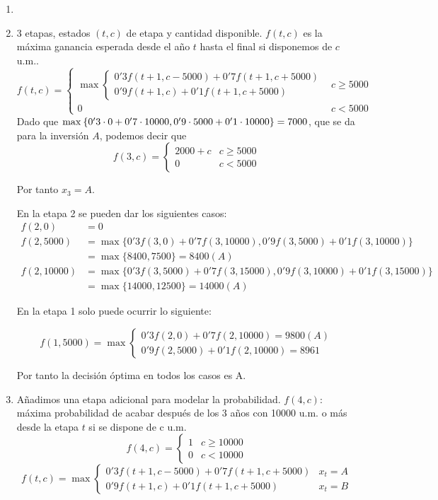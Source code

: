 \documentclass[twoside]{article}
\begin{document}
\begin{solucion}
\begin{enumerate}
\item[]
\item 3 etapas, estados $(t,c)$ de etapa y cantidad disponible. $f(t,c)$ es la máxima ganancia esperada desde el año $t$ hasta el final si disponemos de $c$ u.m..
$$f(t,c)=\begin{cases}
\max\begin{cases}
0'3f(t+1,c-5000)+0'7f(t+1,c+5000)\\
0'9f(t+1,c)+0'1f(t+1,c+5000)
\end{cases}& c\geq 5000\\
0 & c<5000
\end{cases}
$$
Dado que $\max_{}{\left\{0'3\cdot 0+0'7\cdot 10000, 0'9\cdot 5000+0'1\cdot 10000\right\}} = 7000$, que se da para la inversión $A$, podemos decir que
$$f(3,c) = 
\begin{cases}
2000+c & c\geq 5000\\
0 & c<5000
\end{cases}
$$

Por tanto $x_3=A$. 

En la etapa 2 se pueden dar los siguientes casos:
\begin{align*}
f(2,0)&=0\\
f(2,5000)&=\max\{0'3f(3,0)+0'7f(3,10000),0'9f(3,5000)+0'1f(3,10000)\}\\
&=\max\{8400,7500\}=8400(A)\\
f(2,10000)&=\max\{0'3f(3,5000)+0'7f(3,15000),0'9f(3,10000)+0'1f(3,15000)\}\\
&=\max\{14000,12500\}=14000(A)
\end{align*}
 

En la etapa 1 solo puede ocurrir lo siguiente:

$$f(1,5000)=\max\begin{cases}
0'3f(2,0)+0'7f(2,10000)=\boxed{9800}(A)\\
0'9f(2,5000)+0'1f(2,10000)=8961
\end{cases}$$

Por tanto la decisión óptima en todos los casos es A. 

\item Añadimos una etapa adicional para modelar la probabilidad. $f(4,c):$ máxima probabilidad de acabar después de los 3 años con 10000 u.m. o más desde la etapa $t$ si se dispone de c u.m.  
$$f(4,c)=\begin{cases}
1 & c\geq 10000\\
0 & c<10000
\end{cases}$$
$$f(t,c)=\max\begin{cases}
0'3f(t+1,c-5000)+0'7f(t+1,c+5000) & x_t=A\\
0'9f(t+1,c)+0'1f(t+1,c+5000) & x_t=B
\end{cases}$$


\end{enumerate}
\end{solucion}
\end{document}
